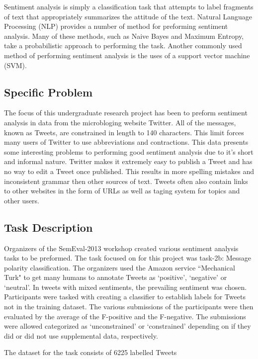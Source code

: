 \documentclass[12pt]{article}
\begin{document}
Sentiment analysis is simply a classification task that attempts to label
fragments of text that appropriately summarizes the attitude of the text.
Natural Language Processing (NLP) provides a number of method for preforming
sentiment analysis. Many of these methods, such as Naive Bayes and Maximum
Entropy, take a probabilistic approach to performing the task. Another commonly
used method of performing sentiment analysis is the uses of a support vector
machine (SVM).


\subsection{Specific Problem}

The focus of this undergraduate research project has been to preform sentiment
analysis in data from the microbloging website Twitter. All of the messages,
known as Tweets, are constrained in length to 140 characters. This limit forces
many users of Twitter to use abbreviations and contractions. This data presents
some interesting problems to performing good sentiment analysis due to it's
short and informal nature. Twitter makes it extremely easy to publish a Tweet
and has no way to edit a Tweet once published. This results in more spelling
mistakes and inconsistent grammar then other sources of text. Tweets often also
contain links to other websites in the form of URLs as well as taging system
for topics and other users.

\subsection{Task Description}

Organizers of the SemEval-2013 workshop created various sentiment analysis
tasks to be preformed. The task focused on for this project was task-2b:
Message polarity classification. The organizers used the Amazon service
``Mechanical Turk" to get many humans to annotate Tweets as `positive',
`negative' or `neutral'. In tweets with mixed sentiments, the prevailing
sentiment was chosen. Participants were tasked with creating a classifier to
establish labels for Tweets not in the training dataset. The various
submissions of the participants were then evaluated by the average of the
F-positive and the F-negative. The submissions were allowed categorized as
`unconstrained' or `constrained' depending on if they did or did not use
supplemental data, respectively.

The dataset for the task consists of 6225 labelled Tweets
\end{document}
